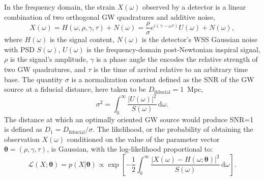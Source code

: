 \documentclass{iopart}
\begin{document}
In the frequency domain, the strain $X (\omega)$ observed by a detector is a linear combination of two orthogonal \ac{GW} quadratures and additive noise,
%
\begin{equation}\label{eq:signal-model}
	X (\omega) = H (\omega, \rho, \gamma, \tau) + N (\omega) = \frac{\rho}{\sigma} e^{i (\gamma - \omega \tau)} U (\omega) + N (\omega),
\end{equation}
%
where $H (\omega)$ is the signal content, $N (\omega)$ is the detector's \ac{WSS} Gaussian noise with \ac{PSD} $S(\omega)$, $U (\omega)$ is the frequency-domain post-Newtonian inspiral signal, $\rho$ is the signal's amplitude, $\gamma$ is a phase angle the encodes the relative strength of two \ac{GW} quadratures, and $\tau$ is the time of arrival relative to an arbitrary time base. The quantity $\sigma$ is a normalization constant defined as the \ac{SNR} of the \ac{GW} source at a fiducial distance, here taken to be $D_\mathrm{fiducial} = 1$~Mpc,
%
\begin{equation}\label{eq:sigma}
    \sigma^2 = \int_0^\infty \frac{\left| U (\omega)\right|^2}{S(\omega)} \, \mathrm{d}\omega.
\end{equation}
%
The distance at which an optimally oriented \ac{GW} source would produce \ac{SNR}=1 is defined as $D_1 = D_\mathrm{fiducial} / \sigma$. The likelihood, or the probability of obtaining the observation $X(\omega)$ conditioned on the value of the parameter vector $\boldsymbol\theta = (\rho, \gamma, \tau)$, is Gaussian, with the log-likelihood proportional to:
%
\begin{equation}\label{eq:gaussian-likelihood}
	\mathcal{L}(X; \boldsymbol\theta) = p(X | \boldsymbol\theta)
		\propto \exp \left[
		- \frac{1}{2} \int_0^\infty \frac{\left|X (\omega)
			- H(\omega; \boldsymbol\theta) \right|^2}{S(\omega)} \, \mathrm{d}\omega
	\right].
\end{equation}
\end{document}
